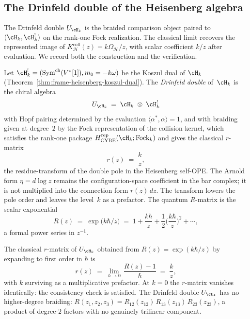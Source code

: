 \subsection{The Drinfeld double of the Heisenberg algebra}
\label{subsec:frame-thesis-drinfeld-double}

The Drinfeld double $U_{\cH_k}$ is the braided comparison object paired
to $(\cH_k,\cH_k^!)$ on the rank-one Fock realization.  The classical
limit recovers the represented image of
$K_{\mathcal H}^{\mathrm{coll}}(z)=k\Omega_{\mathcal H}/z$, with scalar
coefficient $k/z$ after evaluation. We record both the construction
and the verification.

\begin{definition}
\label{def:frame-drinfeld-double-heisenberg}
Let $\cH_k^! = (\mathrm{Sym}^{\mathrm{ch}}(V^*[1]), m_0 = -k\omega)$
be the Koszul dual of $\cH_k$ (Theorem~\ref{thm:frame-heisenberg-koszul-dual}).
The \emph{Drinfeld double} of~$\cH_k$ is the chiral algebra
\begin{equation}\label{eq:frame-drinfeld-double}
 U_{\cH_k}
 \;=\;
 \cH_k \;\otimes\; \cH_k^!
\end{equation}
with Hopf pairing determined by the evaluation
$\langle \alpha^*, \alpha\rangle = 1$, and with braiding given
at degree~$2$ by the Fock representation of the collision kernel,
which satisfies the rank-one package
$H_{\mathrm{CYBE}}^{\mathrm{rep}}(\cH_k;\mathrm{Fock}_k)$ and gives
the classical $r$-matrix
\begin{equation}\label{eq:frame-drinfeld-rmatrix}
 r(z) \;=\; \frac{k}{z},
\end{equation}
the residue-transform of the double pole in the Heisenberg
self-OPE. The Arnold form $\eta=d\log z$ remains the
configuration-space coefficient in the bar complex; it is not
multiplied into the connection form $r(z)\,dz$. The transform
lowers the pole order and leaves the level~$k$ as a prefactor.
The quantum $R$-matrix is the scalar exponential
\begin{equation}\label{eq:frame-drinfeld-Rmatrix}
 R(z) \;=\; \exp\!\bigl(k\hbar/z\bigr)
 \;=\; 1 + \frac{k\hbar}{z} + \frac{1}{2}\bigl(\frac{k\hbar}{z}\bigr)^2 + \cdots,
\end{equation}
a formal power series in $z^{-1}$.
\end{definition}

\begin{proposition}
\label{prop:frame-drinfeld-classical-limit}
The classical $r$-matrix of $U_{\cH_k}$ obtained from
$R(z) = \exp(k\hbar/z)$ by expanding to first order in $\hbar$ is
\[
 r(z) \;=\; \lim_{\hbar\to 0}\,
 \frac{R(z) - 1}{\hbar}
 \;=\; \frac{k}{z},
\]
with $k$ surviving as a multiplicative prefactor. At $k = 0$ the
$r$-matrix vanishes identically: the consistency check is
satisfied. The Drinfeld double $U_{\cH_k}$ has no higher-degree
braiding: $R(z_1, z_2, z_3) = R_{12}(z_{12})\,R_{13}(z_{13})\,
R_{23}(z_{23})$, a product of degree-$2$ factors with no genuinely
trilinear component.
\end{proposition}

